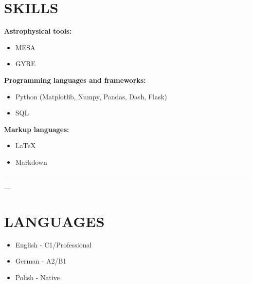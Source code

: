 \documentclass[margin, 10pt]{res} %
\begin{document}
\begin{resume}
\section{SKILLS}

\textbf{Astrophysical tools:}
\begin{itemize}[noitemsep]
    \item MESA
    \item GYRE
\end{itemize}

\textbf{Programming languages and frameworks:}
\begin{itemize}[noitemsep]
    \item Python (Matplotlib, Numpy, Pandas, Dash, Flask)
    \item SQL
\end{itemize}

\textbf{Markup languages:}
\begin{itemize}[noitemsep]
    \item \LaTeX
    \item Markdown
\end{itemize}

---------------------------------------------------------------------------------------------------------------

\section{LANGUAGES}

\begin{itemize}[noitemsep]
    \item English - C1/Professional
    \item German - A2/B1
    \item Polish - Native
\end{itemize}


\end{resume}

\end{document}
